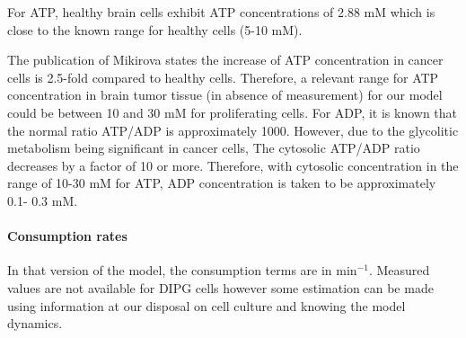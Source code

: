 \documentclass[11pt,a4paper]{article}
\begin{document}
For ATP, healthy brain cells exhibit ATP concentrations of 2.88 mM which is close to the known range for healthy cells (5-10 mM)\cite{Trautmann2009}\cite{Greiner2021}.

The publication of Mikirova  states the increase of ATP concentration in cancer cells is 2.5-fold compared to healthy cells.\cite{Mikirova2018} Therefore, a relevant range for ATP concentration in brain tumor tissue (in absence of measurement) for our model could be between 10 and 30 mM for proliferating cells. For ADP, it is known that the normal ratio ATP/ADP is approximately 1000.\cite{ZIMMERMAN2011} However, due to the glycolitic metabolism being significant in cancer cells, The cytosolic ATP/ADP ratio decreases by a factor of 10 or more.\cite{LEMASTERS2021} Therefore, with cytosolic concentration in the range of 10-30 mM for ATP, ADP concentration is taken to be approximately 0.1- 0.3 mM.

\paragraph{Consumption rates}
In that version of the model, the consumption terms are in min$^{-1}$. Measured values are not available for DIPG cells however some estimation can be made using information at our disposal on cell culture and knowing the model dynamics.

\end{document}
